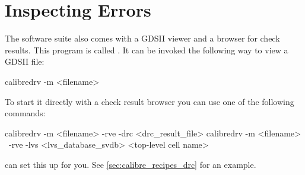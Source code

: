 \section{Inspecting Errors}
The  software suite also comes with a GDSII viewer and a browser for check results.
This program is called . It can be invoked the following way to view a GDSII file:

	\begin{lstbashplain}
calibredrv -m <filename>
	\end{lstbashplain}

To start it directly with a check result browser you can use one of the following commands:

	\begin{lstbashplain}
calibredrv -m <filename> -rve -drc <drc_result_file>
calibredrv -m <filename> \
           -rve -lvs <lvs_database_svdb> <top-level cell name>
	\end{lstbashplain}

 can set this up for you. See \cref{sec:calibre_recipes_drc} for an example.
